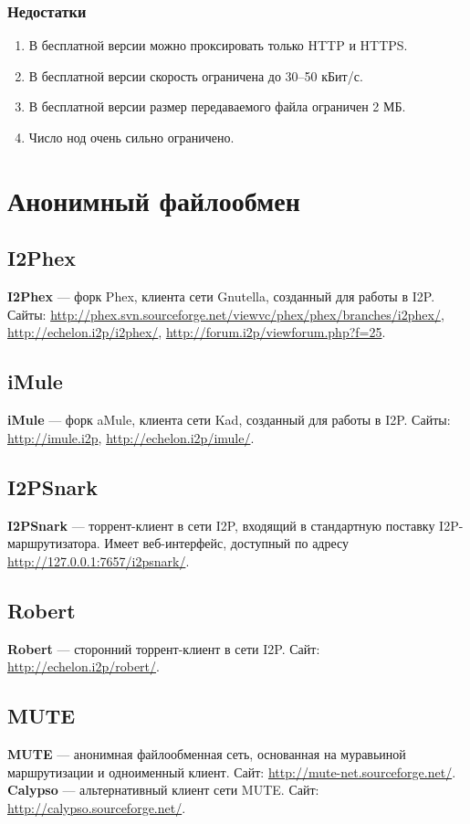 \subsubsection{Недостатки}
\begin{enumerate}
\item В бесплатной версии можно проксировать только HTTP и HTTPS.
\item В бесплатной версии скорость ограничена до 30--50 кБит/с.
\item В бесплатной версии размер передаваемого файла ограничен 2 МБ.
\item Число нод очень сильно ограничено.
\end{enumerate}

\section{Анонимный файлообмен}
\subsection{I2Phex}
\textbf{I2Phex} --- форк Phex, клиента сети Gnutella, созданный для работы в I2P. Сайты: \url{http://phex.svn.sourceforge.net/viewvc/phex/phex/branches/i2phex/}, \url{http://echelon.i2p/i2phex/}, \url{http://forum.i2p/viewforum.php?f=25}.
\subsection{iMule}
\textbf{iMule} --- форк aMule, клиента сети Kad, созданный для работы в I2P. Сайты: \url{http://imule.i2p}, \url{http://echelon.i2p/imule/}.
\subsection{I2PSnark}
\textbf{I2PSnark} --- торрент-клиент в сети I2P, входящий в стандартную поставку I2P-маршрутизатора. Имеет веб-интерфейс, доступный по адресу \url{http://127.0.0.1:7657/i2psnark/}.
\subsection{Robert}
\textbf{Robert} --- сторонний торрент-клиент в сети I2P. Сайт: \url{http://echelon.i2p/robert/}.
\subsection{MUTE}
\textbf{MUTE} --- анонимная файлообменная сеть, основанная на муравьиной маршрутизации и одноименный клиент. Сайт: \url{http://mute-net.sourceforge.net/}.\\
\textbf{Calypso} --- альтернативный клиент сети MUTE. Сайт: \url{http://calypso.sourceforge.net/}.
